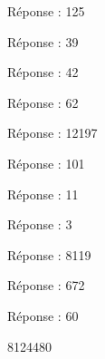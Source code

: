 \begin{sol}
Réponse : 125
\end{sol}

\begin{sol}
Réponse : 39
\end{sol}

\begin{sol}
Réponse : 42
\end{sol}

\begin{sol}
Réponse : 62
\end{sol}

\begin{sol}
Réponse : 12197
\end{sol}

\begin{sol}
Réponse : 101
\end{sol}

\begin{sol}
Réponse : 11
\end{sol}

\begin{sol}
Réponse : 3
\end{sol}

\begin{sol}
Réponse : 8119
\end{sol}

\begin{sol}
Réponse : 672
\end{sol}

\begin{sol}
Réponse : 60
\end{sol}

\begin{sol}
8124480
\end{sol}
